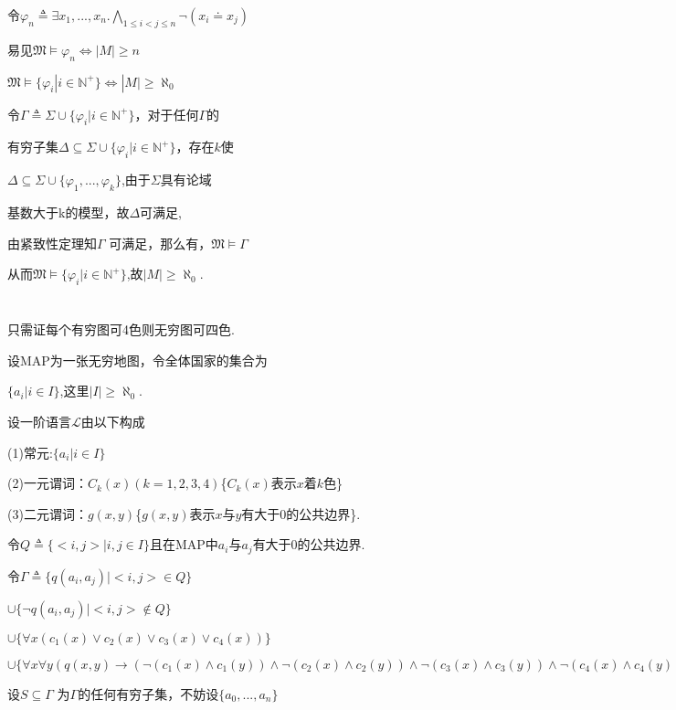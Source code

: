 \documentclass{article}
\begin{document}
令$\varphi_n \triangleq \exists x_1,...,x_n. \bigwedge_{1\leq i < j\leq n} \neg (x_i \doteq x_j)$

易见$\mathfrak{M} \models \varphi_n \Leftrightarrow |M|\geq n$

$\mathfrak{M} \models \{ \varphi_i | i\in \mathbb{N}^+ \} \Leftrightarrow |M|\geq \aleph_0$

令$\Gamma \triangleq \Sigma \cup \{ \varphi_i | i \in \mathbb{N}^+ \}$，对于任何$\Gamma$的

有穷子集$\Delta \subseteq \Sigma \cup \{ \varphi_i | i  \in \mathbb{N}^+ \} $，存在$k$使

$\Delta \subseteq \Sigma \cup \{ \varphi_1 ,..., \varphi_k\} $,由于$\Sigma$具有论域

基数大于k的模型，故$\Delta$可满足,

由紧致性定理知$\Gamma$ 可满足，那么有，$\mathfrak{M}\vDash \Gamma$

从而$\mathfrak{M} \vDash \{ \varphi_i | i  \in \mathbb{N}^+\}$,故$|M|\geq \aleph_0$.


\section{}

只需证每个有穷图可4色则无穷图可四色.

设MAP为一张无穷地图，令全体国家的集合为

$\{a_i |i\in I\}$,这里$|I|\geq \aleph_0$.

设一阶语言$\mathcal{L}$由以下构成

(1)常元:$\{a_i | i\in I\}$

(2)一元谓词：$C_k (x) (k=1,2,3,4)$\{$C_k (x)$表示$x$着$k$色\}

(3)二元谓词：$g(x,y)$\{$g(x,y)$表示$x$与$y$有大于0的公共边界\}.

令$Q \triangleq \{<i,j>|i,j\in I\}$且在MAP中$a_i$与$a_j$有大于0的公共边界.

令$\Gamma \triangleq \{q(a_i,a_j) | <i,j> \in Q\}$

$\cup \{\neg q(a_i,a_j) | <i,j> \notin Q\}$

$\cup\{ \forall x(c_1(x)\vee c_2(x)\vee c_3(x)\vee c_4(x))\}$

$\cup\{ \forall x \forall y (q(x, y)\rightarrow (\neg (c_1(x)\wedge c_1(y))  \wedge \neg(c_2(x)\wedge c_2(y))\wedge \neg(c_3(x)\wedge c_3(y))\wedge \neg(c_4(x)\wedge c_4(y))))\}$

设$S\subseteq \Gamma$ 为$\Gamma$的任何有穷子集，不妨设$\{a_0,...,a_n\}$
\end{document}
